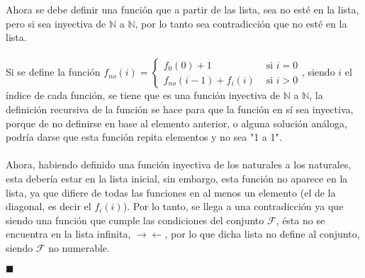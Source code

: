 \documentclass[letter]{article}
\begin{document}
\begin{pregunta}{1}
\begin{enumerate}
		Ahora se debe definir una función que a partir de las lista, sea no esté en la lista, pero si sea inyectiva de $\mathbb{N}$ a $\mathbb{N}$, por lo tanto sea contradicción que no esté en la lista.\\\\
		Si se define la función $f_{no}(i)=\left\{\begin{array}{ll}f_0(0)+1 &\text{ si } i=0\\f_{no}(i-1) + f_i(i) &\text{ si } i>0\end{array}\right.$, siendo $i$ el índice de cada función, se tiene que es una función inyectiva de $\mathbb{N}$ a $\mathbb{N}$, la definición recursiva de la función se hace para que la función en sí sea inyectiva, porque de no definirse en base al elemento anterior, o alguna solución análoga, podría darse que esta función repita elementos y no sea "1 a 1".\\\\Ahora, habiendo definido una función inyectiva de los naturales a los naturales, esta debería estar en la lista inicial, sin embargo, esta función no aparece en la lista, ya que difiere de todas las funciones en al menos un elemento (el de la diagonal, es decir el $f_i(i)$). Por lo tanto, se llega a una contradicción ya que siendo una función que cumple las condiciones del conjunto $\mathcal{F}$, ésta no se encuentra en la lista infinita, $\rightarrow\leftarrow$, por lo que dicha lista no define al conjunto, siendo $\mathcal{F}$ no numerable. 
		\begin{flushright}$\blacksquare$\end{flushright}
		\end{enumerate}
	\end{pregunta}
\end{document}
